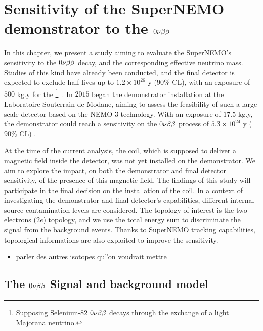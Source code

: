 \chapter{Sensitivity of the SuperNEMO demonstrator to the $0\nu\beta\beta$}
\label{ch:sensitivity}

In this chapter, we present a study aiming to evaluate the SuperNEMO's sensitivity to the $0\nu\beta\beta$ decay, and the corresponding effective neutrino mass.
Studies of this kind have already been conducted, and the final detector is expected to exclude half-lives up to $1.2\times 10^{26}$ y ($90\%$ CL), with an exposure of $500$ kg.y for the \Se\footnote{Supposing Selenium-$82$ $0\nu\beta\beta$ decays through the exchange of a light Majorana neutrino.}~\cite{art:SuperNEMO2010}.
In $2015$ began the demonstrator installation at the Laboratoire Souterrain de Modane, aiming to assess the feasibility of such a large scale detector based on the NEMO-$3$ technology.
With an exposure of $17.5$ kg.y, the demonstrator could reach a sensitivity on the $0\nu\beta\beta$ process of $5.3\times 10^{24}$ y ($90\%$ CL) \cite{CalvezThesis}.

At the time of the current analysis, the coil, which is supposed to deliver a magnetic field inside the detector, was not yet installed on the demonstrator.
We aim to explore the impact, on both the demonstrator and final detector sensitivity, of the presence of this magnetic field.
The findings of this study will participate in the final decision on the installation of the coil.
In a context of investigating the demonstrator and final detector's capabilities, different internal source contamination levels are considered.
The topology of interest is the two electrons ($2e$) topology, and we use the total energy sum to discriminate the signal from the background events.
Thanks to SuperNEMO tracking capabilities, topological informations are also exploited to improve the sensitivity.

\begin{itemize}
\item parler des autres isotopes qu''on voudrait mettre
\end{itemize}



\section{The $0\nu\beta\beta$ Signal and background model}
\label{sec:sensitivity_simus}

